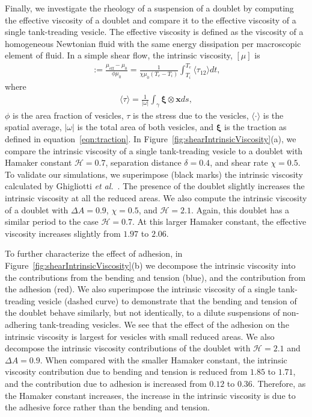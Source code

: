 \documentclass[prf,superscriptaddress,showkeys,longbibliography]{revtex4-1}
\newcommand{\xx}{\mathbf{x}}
\newcommand{\xxi}{\boldsymbol{\xi}}
\begin{document}
Finally, we investigate the rheology of a suspension of a doublet by
computing the effective viscosity of a doublet and compare it to the
effective viscosity of a single tank-treading vesicle. The effective
viscosity is defined as the viscosity of a homogeneous Newtonian fluid
with the same energy dissipation per macroscopic element of fluid.  In a
simple shear flow, the intrinsic viscosity, $[\mu]$ is
\begin{align*}
  [\mu]:= \frac{\mu_{\mathrm{eff}} - \mu_0}{\phi \mu_0} = 
  \frac{1}{\chi \mu_0 (T_e - T_i)} \int_{T_i}^{T_e} 
  \langle \tau_{12} \rangle dt,
\end{align*}
where
\begin{align*}
  \langle \tau \rangle = \frac{1}{|\omega|} \int_{\gamma}
    \xxi \otimes \xx ds,
\end{align*}
$\phi$ is the area fraction of vesicles, $\tau$ is the stress due to the
vesicles, $\langle \cdot \rangle$ is the spatial average, $|\omega|$ is
the total area of both vesicles, and $\xxi$ is the traction as defined
in equation~\eqref{eqn:traction}.  In
Figure~\ref{fig:shearIntrinsicViscosity}(a), we compare the intrinsic
viscosity of a single tank-treading vesicle to a doublet with Hamaker
constant $\mathcal{H} = 0.7$, separation distance $\delta = 0.4$, and
shear rate $\chi = 0.5$.  To validate our simulations, we superimpose
(black marks) the intrinsic viscosity calculated by Ghigliotti {\em et
al.}~\cite{GhigliottiBibenMisbah2010_JFM}.  The presence of the doublet
slightly increases the intrinsic viscosity at all the reduced areas.
We also compute the intrinsic viscosity of a doublet with $\Delta A =
0.9$, $\chi = 0.5$, and $\mathcal{H} = 2.1$.  Again, this doublet has a
similar period to the case $\mathcal{H} = 0.7$. At this larger Hamaker
constant, the effective viscosity increases slightly from $1.97$ to
$2.06$.

To further characterize the effect of adhesion, in
Figure~\ref{fig:shearIntrinsicViscosity}(b) we decompose the intrinsic
viscosity into the contributions from the bending and tension (blue),
and the contribution from the adhesion (red).  We also superimpose the
intrinsic viscosity of a single tank-treading vesicle (dashed curve) to
demonstrate that the bending and tension of the doublet behave
similarly, but not identically, to a dilute suspensions of non-adhering
tank-treading vesicles.  We see that the effect of the adhesion on the
intrinsic viscosity is largest for vesicles with small reduced areas.
We also decompose the intrinsic viscosity contributions of the doublet
with $\mathcal{H} = 2.1$ and $\Delta A = 0.9$.  When compared with the
smaller Hamaker constant, the intrinsic viscosity contribution due to
bending and tension is reduced from $1.85$ to $1.71$, and the
contribution due to adhesion is increased from $0.12$ to $0.36$.
Therefore, as the Hamaker constant increases, the increase in the
intrinsic viscosity is due to the adhesive force rather than the bending
and tension.
\end{document}
